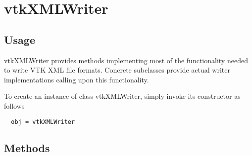 \section{vtkXMLWriter}

\subsection{Usage}

 vtkXMLWriter provides methods implementing most of the
 functionality needed to write VTK XML file formats.  Concrete
 subclasses provide actual writer implementations calling upon this
 functionality.

To create an instance of class vtkXMLWriter, simply
invoke its constructor as follows
\begin{verbatim}
  obj = vtkXMLWriter
\end{verbatim}
\subsection{Methods}

